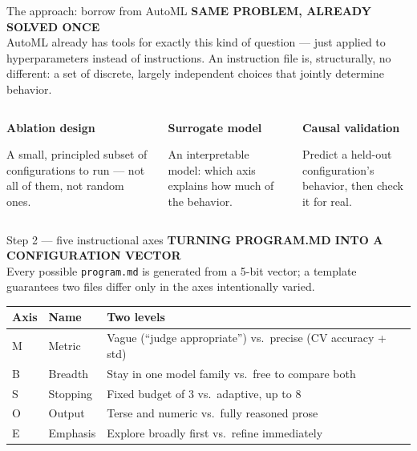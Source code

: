 \documentclass[aspectratio=169,11pt]{beamer}
\newcommand{\kicker}[1]{{\scriptsize\bfseries\color{accentDk}\MakeUppercase{#1}}\\[2pt]}
\begin{document}
\begin{frame}{The approach: borrow from AutoML}
\kicker{Same problem, already solved once}
AutoML already has tools for exactly this kind of question --- just applied to hyperparameters instead of instructions. An instruction file is, structurally, no different: a set of discrete, largely independent choices that jointly determine behavior.
\vspace{4mm}

\begin{columns}[T,onlytextwidth]
\begin{block}{}
\centering\small
\textbf{Ablation design}\\[4pt]
\raggedright A small, principled subset of configurations to run --- not all of them, not random ones.
\end{block}
\begin{block}{}
\centering\small
\textbf{Surrogate model}\\[4pt]
\raggedright An interpretable model: which axis explains how much of the behavior.
\end{block}
\begin{block}{}
\centering\small
\textbf{Causal validation}\\[4pt]
\raggedright Predict a held-out configuration's behavior, then check it for real.
\end{block}
\end{columns}
\end{frame}

\begin{frame}{Step 2 --- five instructional axes}
\kicker{Turning program.md into a configuration vector}
\small
Every possible \texttt{program.md} is generated from a 5-bit vector; a template guarantees two files differ only in the axes intentionally varied.
\vspace{3mm}

\begin{tabular}{@{}p{1.1cm}p{2.0cm}p{8.6cm}@{}}
\toprule
\textbf{Axis} & \textbf{Name} & \textbf{Two levels} \\
\midrule
M & Metric & Vague (``judge appropriate'') vs.\ precise (CV accuracy + std) \\
B & Breadth & Stay in one model family vs.\ free to compare both \\
S & Stopping & Fixed budget of 3 vs.\ adaptive, up to 8 \\
O & Output & Terse and numeric vs.\ fully reasoned prose \\
E & Emphasis & Explore broadly first vs.\ refine immediately \\
\bottomrule
\end{tabular}
\end{frame}
\end{document}
